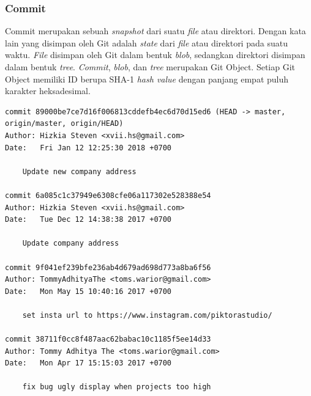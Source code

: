 \subsubsection{Commit}
Commit merupakan sebuah \textit{snapshot} dari suatu \textit{file} atau direktori. Dengan kata lain yang disimpan oleh Git adalah \textit{state} dari \textit{file} atau direktori pada suatu waktu. \textit{File} disimpan oleh Git dalam bentuk \textit{blob}, sedangkan direktori disimpan dalam bentuk \textit{tree}. \textit{Commit}, \textit{blob}, dan \textit{tree} merupakan Git Object. Setiap Git Object memiliki ID berupa SHA-1 \textit{hash value} dengan panjang empat puluh karakter heksadesimal. 





\begin{lstlisting}[caption={Contoh histori commit dalam pengembangan perangkat lunak},label={lst:git_histori},language=plaintext]
commit 89000be7ce7d16f006813cddefb4ec6d70d15ed6 (HEAD -> master, origin/master, origin/HEAD)
Author: Hizkia Steven <xvii.hs@gmail.com>
Date:   Fri Jan 12 12:25:30 2018 +0700

    Update new company address

commit 6a085c1c37949e6308cfe06a117302e528388e54
Author: Hizkia Steven <xvii.hs@gmail.com>
Date:   Tue Dec 12 14:38:38 2017 +0700

    Update company address

commit 9f041ef239bfe236ab4d679ad698d773a8ba6f56
Author: TommyAdhityaThe <toms.warior@gmail.com>
Date:   Mon May 15 10:40:16 2017 +0700

    set insta url to https://www.instagram.com/piktorastudio/

commit 38711f0cc8f487aac62babac10c1185f5ee14d33
Author: Tommy Adhitya The <toms.warior@gmail.com>
Date:   Mon Apr 17 15:15:03 2017 +0700

    fix bug ugly display when projects too high
    
\end{lstlisting}


